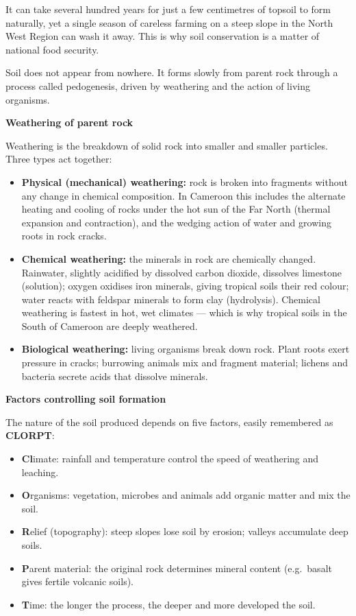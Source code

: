 \documentclass[11pt]{article}
\newcommand{\cle}[1]{{\popxbold\color{popdark}#1}}
\newcounter{popsec}
\newcounter{popsub}
\newcommand{\courssub}[1]{%
  \stepcounter{popsub}%
  \par\vspace{9pt}\noindent{\popxbold\fontsize{11.5}{13}\selectfont\color{popink}{\color{poporange}\thepopsec.\thepopsub}\hspace{6pt}#1}\par\nopagebreak\vspace{4pt}
}
\begin{document}
\begin{savaistu}
It can take several hundred years for just a few centimetres of topsoil to form naturally, yet a single season of careless farming on a steep slope in the North West Region can wash it away. This is why soil conservation is a matter of national food security.
\end{savaistu}

\courssub{Soil Formation (Pedogenesis)}

Soil does not appear from nowhere. It forms slowly from \cle{parent rock} through a process called \cle{pedogenesis}, driven by weathering and the action of living organisms.

\textbf{Weathering of parent rock}\par
Weathering is the breakdown of solid rock into smaller and smaller particles. Three types act together:

\begin{itemize}
\item \textbf{Physical (mechanical) weathering:} rock is broken into fragments without any change in chemical composition. In Cameroon this includes the alternate heating and cooling of rocks under the hot sun of the Far North (thermal expansion and contraction), and the wedging action of water and growing roots in rock cracks.
\item \textbf{Chemical weathering:} the minerals in rock are chemically changed. Rainwater, slightly acidified by dissolved carbon dioxide, dissolves limestone (solution); oxygen oxidises iron minerals, giving tropical soils their red colour; water reacts with feldspar minerals to form clay (hydrolysis). Chemical weathering is fastest in hot, wet climates --- which is why tropical soils in the South of Cameroon are deeply weathered.
\item \textbf{Biological weathering:} living organisms break down rock. Plant roots exert pressure in cracks; burrowing animals mix and fragment material; lichens and bacteria secrete acids that dissolve minerals.
\end{itemize}

\textbf{Factors controlling soil formation}\par
The nature of the soil produced depends on five factors, easily remembered as \textbf{CLORPT}:
\begin{itemize}
\item \textbf{Cl}imate: rainfall and temperature control the speed of weathering and leaching.
\item \textbf{O}rganisms: vegetation, microbes and animals add organic matter and mix the soil.
\item \textbf{R}elief (topography): steep slopes lose soil by erosion; valleys accumulate deep soils.
\item \textbf{P}arent material: the original rock determines mineral content (e.g.\ basalt gives fertile volcanic soils).
\item \textbf{T}ime: the longer the process, the deeper and more developed the soil.
\end{itemize}
\end{document}
